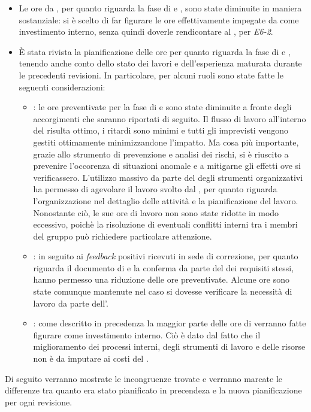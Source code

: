 \begin{itemize}
\item Le ore da \rA, per quanto riguarda la fase di \fC e \fVV, sono state diminuite in maniera sostanziale: si è scelto di far figurare le ore effettivamente impegate da \rA come investimento interno, senza quindi doverle rendicontare al , per \textit{E6-2}.
\item \`E stata rivista la pianificazione delle ore per quanto riguarda la fase di \fC e \fVV, tenendo anche conto dello stato dei lavori e dell'esperienza maturata durante le precedenti revisioni.
In particolare, per alcuni ruoli sono state fatte le seguenti considerazioni:
\begin{itemize}
\item	\textbf{\rRP}: le ore preventivate per la fase di \fC e \fVV sono state diminuite a fronte degli accorgimenti che saranno riportati di seguito.
Il flusso di lavoro all'interno del  risulta ottimo, i ritardi sono minimi e tutti gli imprevisti vengono gestiti ottimamente minimizzandone l'impatto. Ma cosa più importante, grazie allo strumento di prevenzione e analisi dei rischi, si è riuscito a prevenire l'occorenza di situazioni anomale e a mitigarne gli effetti ove si verificassero.
L'utilizzo massivo da parte del  degli strumenti organizzativi ha permesso di agevolare il lavoro svolto dal \rRP, per quanto riguarda l'organizzazione nel dettaglio delle attività e la pianificazione del lavoro.
Nonostante ciò, le sue ore di lavoro non sono state ridotte in modo eccessivo, poichè la risoluzione di eventuali conflitti interni tra i membri del gruppo può richiedere particolare attenzione.
\item \textbf{\rA}: in seguito ai \textit{feedback} positivi ricevuti in sede di correzione, per quanto riguarda il documento di \AR e la conferma da parte del  dei requisiti stessi, hanno permesso una riduzione delle ore preventivate.
Alcune ore sono state comunque mantenute nel caso si dovesse verificare la necessità di lavoro da parte dell'\rA.
\item \textbf{\rAP}: come descritto in precedenza la maggior parte delle ore di \rAP verranno fatte figurare come investimento interno. Ciò è dato dal fatto che il miglioramento dei processi interni, degli strumenti di lavoro e delle risorse non è da imputare ai costi del .
\end{itemize}
\end{itemize}
Di seguito verranno mostrate le incongruenze trovate e verranno marcate le differenze tra quanto era stato pianificato in precendeza e la nuova pianificazione per ogni revisione.

